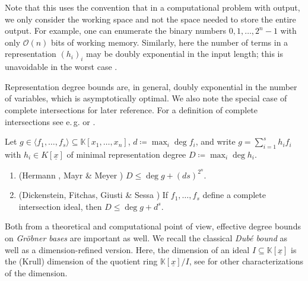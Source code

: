 \documentclass[12pt]{article}
\makeatletter
\newcommand{\KK}{\mathbb{K}}
\newcommand{\Landau}{\mathcal{O}}
\newcommand{\x}{{\underline x}}
\newcommand{\eg}{e.\,g.\@\xspace}
\makeatother
\begin{document}
\begin{remark}\label{rmk:double_exponential}
Note that this uses the convention that in a computational problem with output, we only consider the working space and not the space needed to store the entire output. For example, one can enumerate the binary numbers $0,1,\dots,2^n-1$ with only $\Landau(n)$ bits of working memory. Similarly, here the number of terms in a representation $(h_i)_i$ may be doubly exponential in the input length; this is unavoidable in the worst case \cite{Mayr1982}.
\end{remark}

Representation degree bounds are, in general, doubly exponential in the number of variables, which is asymptotically optimal. We also note the special case of complete intersections for later reference. For a definition of complete intersections see \eg \cite[Exercise 9.4.8]{Cox2016} or \cite[Definition 3.2.23]{Kreuzer2000}.

\begin{theorem}\label{thm:hermann_bound}
Let $g \in \langle f_1,\dots,f_s \rangle \subseteq \KK[x_1,\dots,x_n]$, $d \coloneqq \max_i \deg f_i$, and write $g = \sum_{i=1}^s h_if_i$ with $h_i \in K[\x]$ of minimal representation degree $D \coloneqq \max_i \deg h_i$.
\begin{enumerate}
\item \textup{(Hermann \cite{Hermann1926}, Mayr \& Meyer \cite{Mayr1982})} $D \leq \deg g + (ds)^{2^n}$.
\item \textup{(Dickenstein, Fitchas, Giusti \& Sessa \cite{Dickenstein1991})} If $f_1,\dots,f_s$ define a complete intersection ideal, then $D \leq \deg g + d^s$.
\end{enumerate}
\end{theorem}

Both from a theoretical and computational point of view, effective degree bounds on \emph{Gröbner bases} are important as well. We recall the classical \emph{Dubé bound} as well as a dimension-refined version. Here, the dimension of an ideal $I \subseteq \KK[\x]$ is the (Krull) dimension of the quotient ring $\KK[\x]/I$, see \cite[Chapter 9]{Cox2016} for other characterizations of the dimension.
\end{document}
